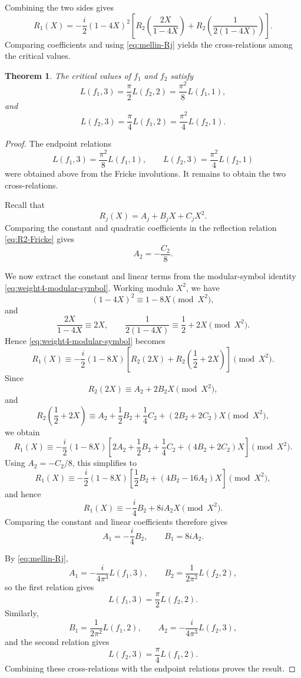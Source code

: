 \documentclass[preprint,12pt]{elsarticle}
\newtheorem{theorem}{Theorem}[section]
\theoremstyle{definition}
\theoremstyle{remark}
\begin{document}
Combining the two sides gives
\begin{equation}\label{eq:weight4-modular-symbol}
	R_1(X)
	=
	-\frac{i}{2}(1-4X)^2
	\left[
	R_2\left(\frac{2X}{1-4X}\right)
	+
	R_2\left(\frac{1}{2(1-4X)}\right)
	\right].
\end{equation}
Comparing coefficients and using \eqref{eq:mellin-Rj} yields the cross-relations among the critical values.
	
	\begin{theorem}
		The critical values of $f_1$ and $f_2$ satisfy
		\[
		L(f_1,3)=\frac{\pi}{2}L(f_2,2)
		=\frac{\pi^2}{8}L(f_1,1),
		\]
		and
		\[
		L(f_2,3)=\frac{\pi}{4}L(f_1,2)
		=\frac{\pi^2}{4}L(f_2,1).
		\]
	\end{theorem}
	

	
\begin{proof}
	The endpoint relations
	\[
	L(f_1,3)=\frac{\pi^2}{8}L(f_1,1),
	\qquad
	L(f_2,3)=\frac{\pi^2}{4}L(f_2,1)
	\]
	were obtained above from the Fricke involutions. It remains to obtain the two cross-relations.
	
	Recall that
	\[
	R_j(X)=A_j+B_jX+C_jX^2.
	\]
	Comparing the constant and quadratic coefficients in the reflection relation
	\eqref{eq:R2-Fricke} gives
	\[
	A_2=-\frac{C_2}{8}.
	\]
	
	We now extract the constant and linear terms from the modular-symbol identity
	\eqref{eq:weight4-modular-symbol}. Working modulo $X^2$, we have
	\[
	(1-4X)^2\equiv 1-8X \pmod{X^2},
	\]
	and
	\[
	\frac{2X}{1-4X}\equiv 2X,
	\qquad
	\frac{1}{2(1-4X)}\equiv \frac{1}{2}+2X
	\pmod{X^2}.
	\]
	Hence \eqref{eq:weight4-modular-symbol} becomes
	\[
	R_1(X)
	\equiv
	-\frac{i}{2}(1-8X)
	\left[
	R_2(2X)
	+
	R_2\left(\frac{1}{2}+2X\right)
	\right]
	\pmod{X^2}.
	\]
	Since
	\[
	R_2(2X)\equiv A_2+2B_2X\pmod{X^2},
	\]
	and
	\[
	R_2\left(\frac{1}{2}+2X\right)
	\equiv
	A_2+\frac{1}{2}B_2+\frac{1}{4}C_2
	+(2B_2+2C_2)X
	\pmod{X^2},
	\]
	we obtain
	\[
	R_1(X)
	\equiv
	-\frac{i}{2}(1-8X)
	\left[
	2A_2+\frac{1}{2}B_2+\frac{1}{4}C_2
	+(4B_2+2C_2)X
	\right]
	\pmod{X^2}.
	\]
	Using $A_2=-C_2/8$, this simplifies to
	\[
	R_1(X)
	\equiv
	-\frac{i}{2}(1-8X)
	\left[
	\frac{1}{2}B_2+(4B_2-16A_2)X
	\right]
	\pmod{X^2},
	\]
	and hence
	\[
	R_1(X)
	\equiv
	-\frac{i}{4}B_2+8iA_2X
	\pmod{X^2}.
	\]
	Comparing the constant and linear coefficients therefore gives
	\[
	A_1=-\frac{i}{4}B_2,
	\qquad
	B_1=8iA_2.
	\]
	
	By \eqref{eq:mellin-Rj},
	\[
	A_1=-\frac{i}{4\pi^3}L(f_1,3),
	\qquad
	B_2=\frac{1}{2\pi^2}L(f_2,2),
	\]
	so the first relation gives
	\[
	L(f_1,3)=\frac{\pi}{2}L(f_2,2).
	\]
	Similarly,
	\[
	B_1=\frac{1}{2\pi^2}L(f_1,2),
	\qquad
	A_2=-\frac{i}{4\pi^3}L(f_2,3),
	\]
	and the second relation gives
	\[
	L(f_2,3)=\frac{\pi}{4}L(f_1,2).
	\]
	Combining these cross-relations with the endpoint relations proves the result.
\end{proof}
	
\end{document}
